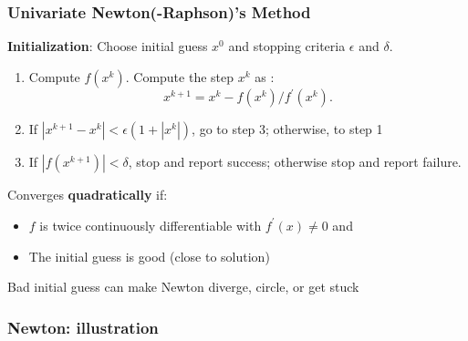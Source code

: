 \documentclass[bigger]{beamer}
\begin{document}
\begin{frame}%

\frametitle{Univariate Newton(-Raphson)'s Method }

\textbf{Initialization}: Choose initial guess $x^{0}$ and stopping criteria $%
\epsilon $ and $\delta $.

\begin{enumerate}
\item Compute $f(x^{k})$. Compute the step $x^{k}$ as : 
\begin{equation*}
x^{k+1}=x^{k}-f(x^{k})/f^{\prime }(x^{k}).
\end{equation*}

\item If $|x^{k+1}-x^{k}|<\epsilon (1+|x^{k}|)$, go to step 3; otherwise, to
step 1

\item If $|f(x^{k+1})|<\delta $, stop and report success; \newline
otherwise stop and report failure.
\end{enumerate}

Converges \textbf{quadratically} if:

\begin{itemize}
\item $f$ is twice continuously differentiable with $f^{\prime}(x)\neq 0$ and

\item The initial guess is good (close to solution)
\end{itemize}

Bad initial guess can make Newton diverge, circle, or get stuck


\end{frame}%

\begin{frame}%

\frametitle{Newton: illustration}



\end{frame}%
\end{document}

